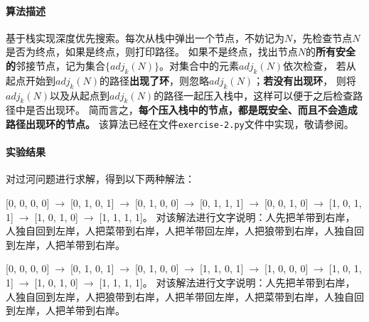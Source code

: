 \documentclass{article}
\begin{document}
\paragraph{算法描述}
基于栈实现深度优先搜索。每次从栈中弹出一个节点，不妨记为$N$，先检查节点$N$是否为终点，如果是终点，则打印路径。
如果不是终点，找出节点$N$的\textbf{所有安全的}邻接节点，记为集合$\{adj_k(N)\}$。对集合中的元素$adj_k(N)$依次检查，
若从起点开始到$adj_k(N)$的路径\textbf{出现了环}，则忽略$adj_k(N)$；\textbf{若没有出现环}，
则将$adj_k(N)$以及从起点到$adj_k(N)$的路径一起压入栈中，这样可以便于之后检查路径中是否出现环。
简而言之，\textbf{每个压入栈中的节点，都是既安全、而且不会造成路径出现环的节点。}
该算法已经在文件\texttt{exercise-2.py}文件中实现，敬请参阅。

\paragraph{实验结果}
对过河问题进行求解，得到以下两种解法：

[0, 0, 0, 0]$\;\rightarrow\;$[0, 1, 0, 1]$\;\rightarrow\;$[0, 1, 0, 0]$\;\rightarrow\;$[0, 1, 1, 1]$\;\rightarrow\;$[0, 0, 1, 0]$\;\rightarrow\;$[1, 0, 1, 1]$\;\rightarrow\;$[1, 0, 
1, 0]$\;\rightarrow\;$[1, 1, 1, 1]。 
对该解法进行文字说明：人先把羊带到右岸，人独自回到左岸，人把菜带到右岸，人把羊带回左岸，人把狼带到右岸，人独自回到左岸，人把羊带到右岸。

[0, 0, 0, 0]$\;\rightarrow\;$[0, 1, 0, 1]$\;\rightarrow\;$[0, 1, 0, 0]$\;\rightarrow\;$[1, 1, 0, 1]$\;\rightarrow\;$[1, 0, 0, 0]$\;\rightarrow\;$[1, 0, 1, 1]$\;\rightarrow\;$[1, 0, 
1, 0]$\;\rightarrow\;$[1, 1, 1, 1]。 
对该解法进行文字说明：人先把羊带到右岸，人独自回到左岸，人把狼带到右岸，人把羊带回左岸，人把菜带到右岸，人独自回到左岸，人把羊带到右岸。
\end{document}
